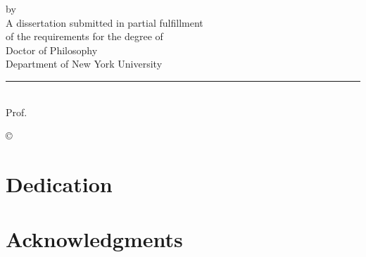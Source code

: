 \documentclass[12pt,letterpaper,oneside,final]{memoir}
\begin{document}
\fussy
{} %
\frontmatter
\hyphenation{}
\DoubleSpacing
\begin{center}
\thispagestyle{empty}


\vspace{20mm}
by\\
\vspace{10mm}
\vspace{10mm}
A dissertation submitted in partial fulfillment\\
of the requirements for the degree of\\
Doctor of Philosophy\\
Department of %
New York University\\
\end{center}
\vspace{35mm}
\begin{flushright}
{\rule[0pt]{45mm}{0.1mm}}\\

Prof. %

\end{flushright}

\newpage

\thispagestyle{empty}

\begin{center} © %
\end{center}


\newpage

\thispagestyle{empty}

\chapter{Dedication}

\DoubleSpacing

\newpage


\chapter{Acknowledgments}
\end{document}
